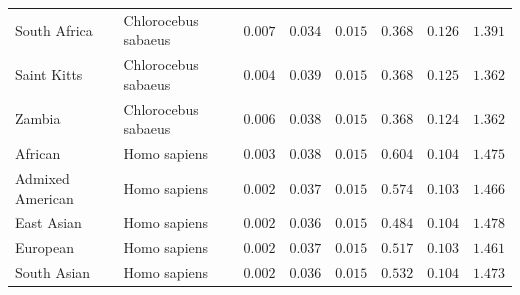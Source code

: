 \documentclass{article}
\begin{document}
\begin{center}
\begin{longtable*}{|l|l|r|r|r|r|r|r|}
            South Africa         & Chlorocebus sabaeus & $ 0.007$        & $ 0.034$                   & $ 0.015$                      & $ 0.368$                             & $ 0.126$                      & $ 1.391$           \\
            Saint Kitts          & Chlorocebus sabaeus & $ 0.004$        & $ 0.039$                   & $ 0.015$                      & $ 0.368$                             & $ 0.125$                      & $ 1.362$           \\
            Zambia               & Chlorocebus sabaeus & $ 0.006$        & $ 0.038$                   & $ 0.015$                      & $ 0.368$                             & $ 0.124$                      & $ 1.362$           \\
            African              & Homo sapiens        & $ 0.003$        & $ 0.038$                   & $ 0.015$                      & $ 0.604$                             & $ 0.104$                      & $ 1.475$           \\
            Admixed American     & Homo sapiens        & $ 0.002$        & $ 0.037$                   & $ 0.015$                      & $ 0.574$                             & $ 0.103$                      & $ 1.466$           \\
            East Asian           & Homo sapiens        & $ 0.002$        & $ 0.036$                   & $ 0.015$                      & $ 0.484$                             & $ 0.104$                      & $ 1.478$           \\
            European             & Homo sapiens        & $ 0.002$        & $ 0.037$                   & $ 0.015$                      & $ 0.517$                             & $ 0.103$                      & $ 1.461$           \\
            South Asian          & Homo sapiens        & $ 0.002$        & $ 0.036$                   & $ 0.015$                      & $ 0.532$                             & $ 0.104$                      & $ 1.473$           \\
        \end{longtable*}
    \end{center}
\end{document}
